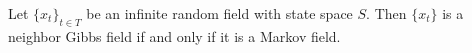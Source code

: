 Let $\{x_t\}_{t \in T}$ be an infinite random field with state space $S$. Then $\{x_t\}$ is a neighbor Gibbs field if and only if it is a Markov field.
